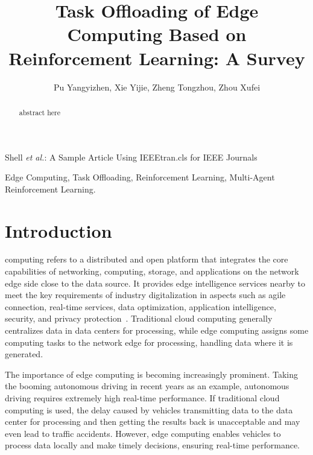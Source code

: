 \documentclass[journal]{IEEEtran}
\begin{document}
\title{Task Offloading of Edge Computing Based on Reinforcement Learning: A Survey}

\author{Pu Yangyizhen, Xie Yijie, Zheng Tongzhou, Zhou Xufei}

%
{Shell \MakeLowercase{\textit{et al.}}: A Sample Article Using IEEEtran.cls for IEEE Journals}


\maketitle

\begin{abstract}
abstract here
\end{abstract}

\begin{IEEEkeywords}
Edge Computing, Task Offloading, Reinforcement Learning, Multi-Agent Reinforcement Learning.
\end{IEEEkeywords}

\section{Introduction}
 computing refers to a distributed and open platform that integrates the core capabilities of networking, 
computing, storage, and applications on the network edge side close to the data source. 
It provides edge intelligence services nearby to meet the key requirements of industry digitalization in aspects such as agile connection, 
real-time services, data optimization, application intelligence, security, and privacy protection~\cite{7807196}. 
Traditional cloud computing generally centralizes data in data centers for processing, 
while edge computing assigns some computing tasks to the network edge for processing, handling data where it is generated.

The importance of edge computing is becoming increasingly prominent. 
Taking the booming autonomous driving in recent years as an example, autonomous driving requires extremely high real-time performance. 
If traditional cloud computing is used, the delay caused by vehicles transmitting data to the data center for processing and then 
getting the results back is unacceptable and may even lead to traffic accidents. 
However, edge computing enables vehicles to process data locally and make timely decisions, ensuring real-time performance.
\end{document}
